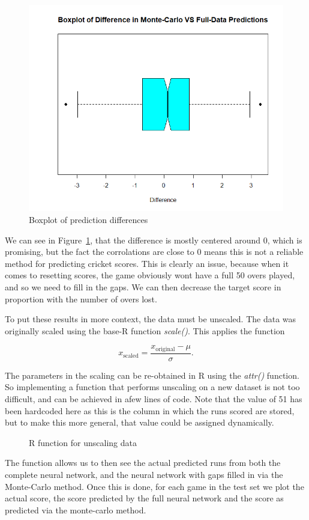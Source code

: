 \begin{figure}[h]
    \centering
    \includegraphics[width=0.4\linewidth]{figures/diffbox.png}
    \caption{Boxplot of prediction differences}
    \label{diffbox}
\end{figure}

We can see in Figure~\ref{diffbox}, that the difference is mostly centered around 0, which is promising, but the fact the corrolations are close to 0 means this is not a reliable method for predicting 
cricket scores. This is clearly an issue, because when it comes to resetting scores, the game obviously wont have a full 50 overs played, and so we need to fill in the gaps. We can then decrease the target score in proportion 
with the number of overs lost.

To put these results in more context, the data must be unscaled. The data was originally scaled using the base-R function \textit{scale()}. This applies the function

\[
    x_{\text{scaled}} = \frac{x_{\text{original}}-\mu}{\sigma}.    
\]

The parameters in the scaling can be re-obtained in R using the \textit{attr()} function. So implementing a function that 
performs unscaling on a new dataset is not too difficult, and can be achieved in afew lines of code. Note that the value of 51 has been hardcoded 
here as this is the column in which the runs scored are stored, but to make this more general, that value could be assigned dynamically.

\begin{figure}[h]
    
    \caption{R function for unscaling data}
    \label{unscale}
\end{figure}

The function allows us to then see the actual predicted runs from both the complete neural network, and the neural network with 
gaps filled in via the Monte-Carlo method. Once this is done, for each game in the test set we plot the actual score, the score predicted by the full neural network and 
the score as predicted via the monte-carlo method. 


